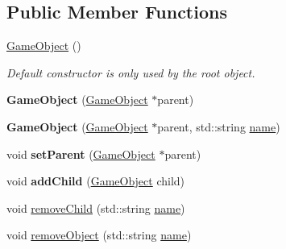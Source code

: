 \subsection*{Public Member Functions}
\begin{DoxyCompactItemize}
\item 
\mbox{\label{classce_1_1game_1_1_game_object_a38079a556bd77da1c43d53b092b975ed}} 
\hyperlink{classce_1_1game_1_1_game_object_a38079a556bd77da1c43d53b092b975ed}{Game\+Object} ()
\begin{DoxyCompactList}\small\item\em Default constructor is only used by the root object. \end{DoxyCompactList}\item 
\mbox{\label{classce_1_1game_1_1_game_object_a7405cbc0222f54df18d7524c6c4b0e54}} 
{\bfseries Game\+Object} (\hyperlink{classce_1_1game_1_1_game_object}{Game\+Object} $\ast$parent)
\item 
\mbox{\label{classce_1_1game_1_1_game_object_a546490e03f69dc2effa118f87c3bc7d0}} 
{\bfseries Game\+Object} (\hyperlink{classce_1_1game_1_1_game_object}{Game\+Object} $\ast$parent, std\+::string \hyperlink{classce_1_1game_1_1_game_object_a1de1f674c70df3bbba6aefb938ad8f32}{name})
\item 
\mbox{\label{classce_1_1game_1_1_game_object_a483e2391d1a903ef7e0a179bc7245529}} 
void {\bfseries set\+Parent} (\hyperlink{classce_1_1game_1_1_game_object}{Game\+Object} $\ast$parent)
\item 
\mbox{\label{classce_1_1game_1_1_game_object_a1425bed6a585dd450f8dcd7b0d91c33a}} 
void {\bfseries add\+Child} (\hyperlink{classce_1_1game_1_1_game_object}{Game\+Object} child)
\item 
void \hyperlink{classce_1_1game_1_1_game_object_ab00a9e4dcbadfa208df56e3cbed9e8d2}{remove\+Child} (std\+::string \hyperlink{classce_1_1game_1_1_game_object_a1de1f674c70df3bbba6aefb938ad8f32}{name})
\item 
void \hyperlink{classce_1_1game_1_1_game_object_ab700981d509605a9b1bef436207e5d54}{remove\+Object} (std\+::string \hyperlink{classce_1_1game_1_1_game_object_a1de1f674c70df3bbba6aefb938ad8f32}{name})

\end{DoxyCompactItemize}

